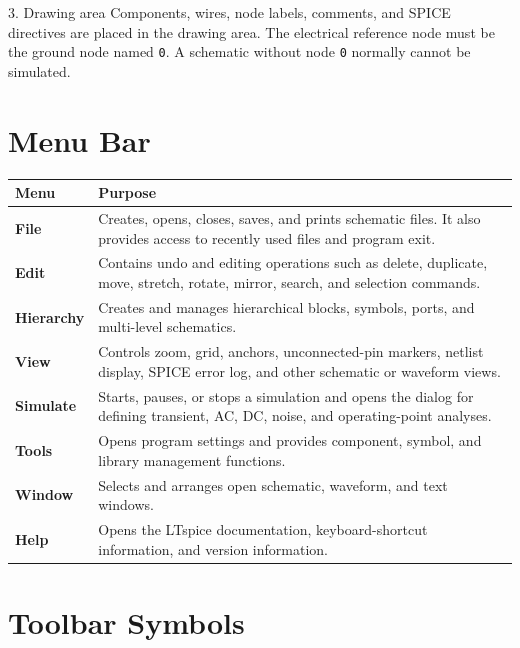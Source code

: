 \begin{formulaBox}{3. Drawing area}
Components, wires, node labels, comments, and SPICE directives are placed in
the drawing area. The electrical reference node must be the ground node named
\texttt{0}. A schematic without node \texttt{0} normally cannot be simulated.
\end{formulaBox}

\section{Menu Bar}

\small
\begin{tabularx}{\textwidth}{>{\bfseries}p{24mm} X}
\toprule
Menu & Purpose \\
\midrule
File & Creates, opens, closes, saves, and prints schematic files. It also
       provides access to recently used files and program exit. \\
Edit & Contains undo and editing operations such as delete, duplicate, move,
       stretch, rotate, mirror, search, and selection commands. \\
Hierarchy & Creates and manages hierarchical blocks, symbols, ports, and
       multi-level schematics. \\
View & Controls zoom, grid, anchors, unconnected-pin markers, netlist display,
       SPICE error log, and other schematic or waveform views. \\
Simulate & Starts, pauses, or stops a simulation and opens the dialog for
       defining transient, AC, DC, noise, and operating-point analyses. \\
Tools & Opens program settings and provides component, symbol, and library
       management functions. \\
Window & Selects and arranges open schematic, waveform, and text windows. \\
Help & Opens the LTspice documentation, keyboard-shortcut information, and
       version information. \\
\bottomrule
\end{tabularx}
\normalsize

\section{Toolbar Symbols}

